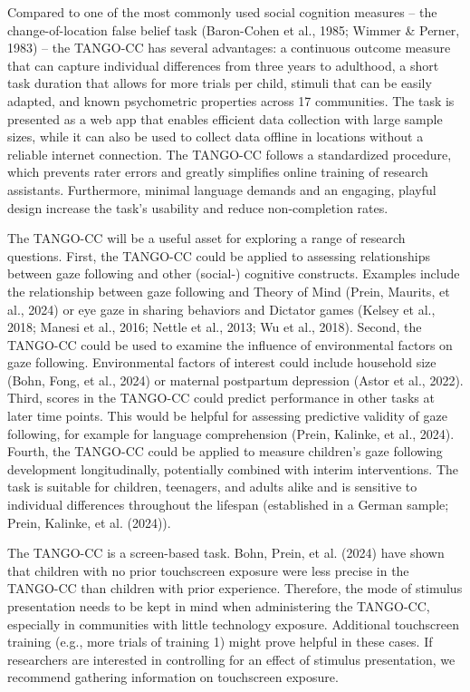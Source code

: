 \documentclass[
  man,floatsintext]{apa7}
\begin{document}
Compared to one of the most commonly used social cognition measures -- the change-of-location false belief task (Baron-Cohen et al., 1985; Wimmer \& Perner, 1983) -- the TANGO-CC has several advantages: a continuous outcome measure that can capture individual differences from three years to adulthood, a short task duration that allows for more trials per child, stimuli that can be easily adapted, and known psychometric properties across 17 communities.
The task is presented as a web app that enables efficient data collection with large sample sizes, while it can also be used to collect data offline in locations without a reliable internet connection.
The TANGO-CC follows a standardized procedure, which prevents rater errors and greatly simplifies online training of research assistants.
Furthermore, minimal language demands and an engaging, playful design increase the task's usability and reduce non-completion rates.

The TANGO-CC will be a useful asset for exploring a range of research questions.
First, the TANGO-CC could be applied to assessing relationships between gaze following and other (social-) cognitive constructs. Examples include the relationship between gaze following and Theory of Mind (Prein, Maurits, et al., 2024) or eye gaze in sharing behaviors and Dictator games (Kelsey et al., 2018; Manesi et al., 2016; Nettle et al., 2013; Wu et al., 2018). Second, the TANGO-CC could be used to examine the influence of environmental factors on gaze following. Environmental factors of interest could include household size (Bohn, Fong, et al., 2024) or maternal postpartum depression (Astor et al., 2022). Third, scores in the TANGO-CC could predict performance in other tasks at later time points. This would be helpful for assessing predictive validity of gaze following, for example for language comprehension (Prein, Kalinke, et al., 2024). Fourth, the TANGO-CC could be applied to measure children's gaze following development longitudinally, potentially combined with interim interventions. The task is suitable for children, teenagers, and adults alike and is sensitive to individual differences throughout the lifespan (established in a German sample; Prein, Kalinke, et al. (2024)).

The TANGO-CC is a screen-based task.
Bohn, Prein, et al. (2024) have shown that children with no prior touchscreen exposure were less precise in the TANGO-CC than children with prior experience.
Therefore, the mode of stimulus presentation needs to be kept in mind when administering the TANGO-CC, especially in communities with little technology exposure.
Additional touchscreen training (e.g., more trials of training 1) might prove helpful in these cases.
If researchers are interested in controlling for an effect of stimulus presentation, we recommend gathering information on touchscreen exposure.
\end{document}
